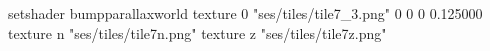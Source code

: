 setshader bumpparallaxworld
texture 0 "ses/tiles/tile7_3.png" 0 0 0 0.125000
texture n "ses/tiles/tile7n.png"
texture z "ses/tiles/tile7z.png"

